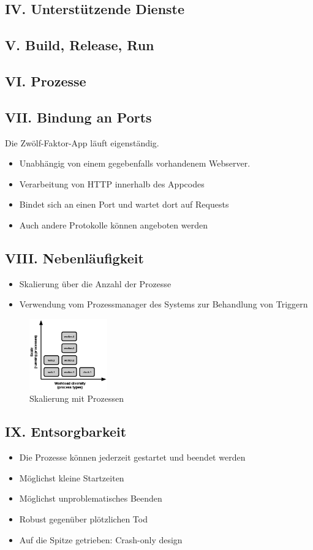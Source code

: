 \documentclass[fleqn,10pt]{SelfArx} %
\begin{document}
\subsection{IV. Unterstützende Dienste}
\subsection{V. Build, Release, Run}
\subsection{VI. Prozesse}
\subsection{VII. Bindung an Ports}
Die Zwölf-Faktor-App läuft eigenständig.
\begin{itemize}
	\item Unabhängig von einem gegebenfalls vor\-han\-den\-em Web\-server.
	\item Verarbeitung von HTTP innerhalb des Appcodes
	\item Bindet sich an einen Port und wartet dort auf Requests
	\item Auch andere Protokolle können angeboten werden
\end{itemize}
\subsection{VIII. Nebenläufigkeit}
\begin{itemize}
	\item Skalierung über die Anzahl der Prozesse
	\item Verwendung vom Prozessmanager des Systems zur Behandlung \newline von Triggern
\end{itemize}
\begin{figure}[htpb]
	\centering
	\includegraphics[width=0.3\textwidth]{../process-types.png}
	\caption{Skalierung mit Prozessen~\cite{factor-concurrency}}
\end{figure}
\subsection{IX. Entsorgbarkeit}
\begin{itemize}
	\item Die Prozesse können jederzeit gestartet und beendet werden
	\item Möglichst kleine Startzeiten
	\item Möglichst unproblematisches Beenden
	\item Robust gegenüber plötzlichen Tod
	\item Auf die Spitze getrieben: Crash-only design
\end{itemize}
\end{document}
